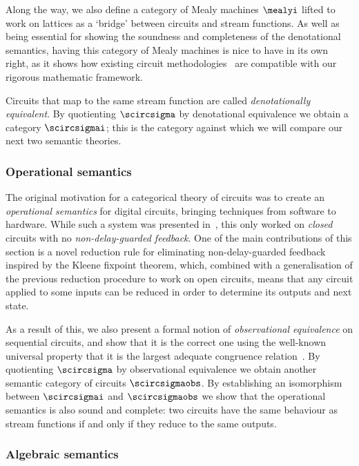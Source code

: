 Along the way, we also define a category of Mealy machines \(\mealyi\) lifted to
work on lattices as a `bridge' between circuits and stream functions.
As well as being essential for showing the soundness and completeness of the
denotational semantics, having this category of Mealy machines is nice to have
in its own right, as it shows how existing circuit
methodologies~\cite{kohavi2009switching} are compatible with our rigorous
mathematic framework.

Circuits that map to the same stream function are called
\emph{denotationally equivalent}.
By quotienting \(\scircsigma\) by denotational equivalence we obtain a category
\(\scircsigmai\); this is the category against which we will compare our next
two semantic theories.

\subsubsection{Operational semantics}

The original motivation for a categorical theory of circuits was to create an
\emph{operational semantics} for digital circuits, bringing techniques from
software to hardware.
While such a system was presented in~\cite{ghica2017diagrammatic}, this only
worked on \emph{closed} circuits with no \emph{non-delay-guarded feedback}.
One of the main contributions of this section is a novel reduction rule for
eliminating non-delay-guarded feedback inspired by the Kleene fixpoint theorem,
which, combined with a generalisation of the previous reduction procedure to
work on open circuits, means that any circuit applied to some inputs can be
reduced in order to determine its outputs and next state.

As a result of this, we also present a formal notion of
\emph{observational equivalence} on sequential circuits, and show that it is the
correct one using the well-known universal property that it is the largest
adequate congruence relation~\cite{gordon1998operational}.
By quotienting \(\scircsigma\) by observational equivalence we obtain another
semantic category of circuits \(\scircsigmaobs\).
By establishing an isomorphism between \(\scircsigmai\) and \(\scircsigmaobs\)
we show that the operational semantics is also sound and complete: two circuits
have the same behaviour as stream functions if and only if they reduce to the
same outputs.

\subsubsection{Algebraic semantics}

